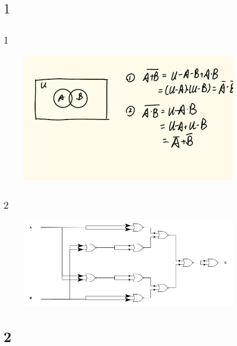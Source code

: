 \documentclass[12pt,a4paper]{ctexart}
\begin{document}
\section*{$1$}
\subsection*{$1$}
\begin{figure}[h]
    \begin{center}
        \includegraphics[scale=0.5]{Screenshot_20240321_171754_com.huawei.hinote.png}
    \end{center}
\end{figure}
\subsection*{$2$}
\begin{figure}[h]
    \begin{center}
        \includegraphics[scale=0.5]{未命名绘图.drawio.png}
    \end{center}
\end{figure}
\newpage
\section*{2}
\end{document}
